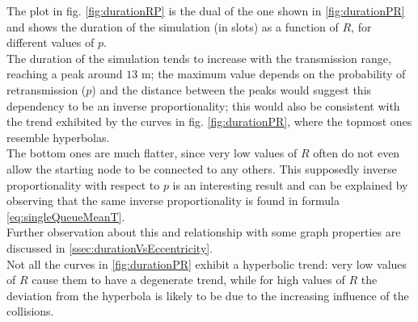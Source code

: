 The plot in fig. \ref{fig:durationRP} is the dual of the one shown in \ref{fig:durationPR} and shows the duration of the simulation (in slots) as a
function of $R$, for different values of $p$.\\
The duration of the simulation tends to increase with the transmission range,
reaching a peak around $13$ m; the maximum value depends on the probability of
retransmission ($p$) and the distance between the peaks would suggest this dependency to be an inverse proportionality; this would also be consistent with the trend exhibited by the curves in fig. \ref{fig:durationPR}, where the topmost ones resemble hyperbolas.\\
The bottom ones are much flatter, since very low values of $R$ often do not even allow the starting node to be connected to any others.
This supposedly inverse proportionality with respect to $p$ is an interesting result and can be explained by observing that the same inverse proportionality is found in formula \ref{eq:singleQueueMeanT}.\\
Further observation about this and relationship with some graph properties are discussed in \ref{ssec:durationVsEccentricity}.\\
\newpage
Not all the curves in \ref{fig:durationPR} exhibit a hyperbolic trend: very low values of $R$ cause them to have a degenerate trend, while for high values of $R$ the deviation from the hyperbola is likely to be due to the increasing influence of the collisions.
%
